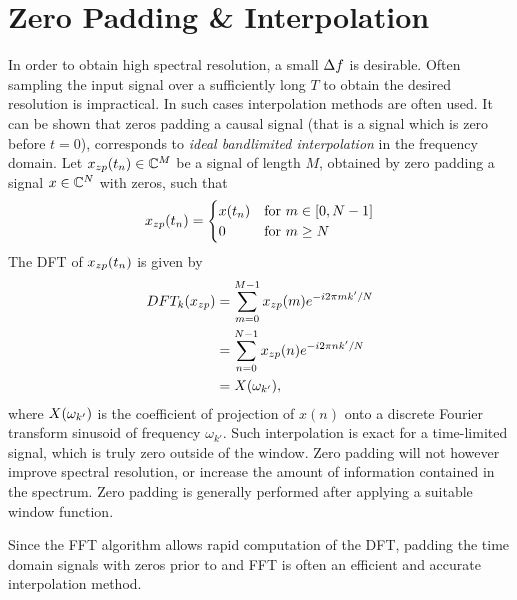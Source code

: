 \section{Zero Padding \& Interpolation}
In order to obtain high spectral resolution, a small $\Delta f$ is desirable.
Often sampling the input signal over a sufficiently long $T$ to obtain the desired resolution is impractical. In such cases interpolation methods are often used. It can be shown that zeros padding a causal signal (that is a signal which is zero before $t=0$), corresponds to \textit{ideal bandlimited interpolation} in the frequency domain. Let $x_{zp}(t_n) \in \mathbb{C}^{M}$ be a signal of length $M$, obtained by zero padding a signal $x \in
\mathbb{C}^{N}$ with zeros, such that
\begin{align*}
  x_{zp}(t_n) =
  \begin{cases}
    x(t_n) & \textrm{for}\ m \in [0,N-1] \\
    0 & \textrm{for}\ m \ge N
  \end{cases}
\end{align*}
The DFT of $x_{zp}(t_n)$ is given by
\begin{align*}
  DFT_k(x_{zp})
  &= \sum_{m=0}^{M-1} x_{zp}(m) e^{- i 2 \pi m k' / N} \\
  &= \sum_{n=0}^{N-1} x_{zp}(n) e^{- i 2 \pi n k' / N} \\ &= X(\omega_{k'})
,
\end{align*}
where $X(\omega_{k'})$ is the coefficient of projection of $x(n)$ onto a discrete Fourier transform sinusoid of frequency $\omega_{k'}$. Such interpolation is exact for a time-limited signal, which is truly zero outside of the window. Zero padding will not however improve spectral resolution, or increase the amount of information contained in the spectrum. Zero padding is generally performed after applying a suitable window function.

Since the FFT algorithm allows rapid computation of the DFT, padding the time
domain signals with zeros prior to and FFT is often an efficient and accurate
interpolation method.


